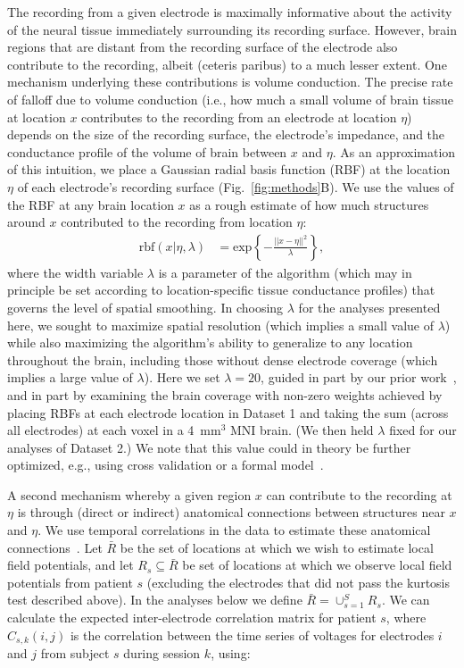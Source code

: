 \documentclass[11pt]{article}
\begin{document}
The recording from a given electrode is maximally informative about
the activity of the neural tissue immediately surrounding its
recording surface.  However, brain regions that are distant from the
recording surface of the electrode also contribute to the recording,
albeit (ceteris paribus) to a much lesser extent.  One mechanism
underlying these contributions is volume conduction.  The precise rate
of falloff due to volume conduction (i.e., how much a small volume of
brain tissue at location $x$ contributes to the recording from an
electrode at location $\eta$) depends on the size of the recording
surface, the electrode's impedance, and the conductance profile of the
volume of brain between $x$ and $\eta$.  As an approximation of this
intuition, we place a Gaussian radial basis function (RBF) at the
location $\eta$ of each electrode's recording surface
(Fig.~\ref{fig:methods}B).  We use the values of the RBF at any brain
location $x$ as a rough estimate of how much structures around $x$
contributed to the recording from location $\eta$:
\begin{align}
  \mathrm{rbf}(x|\eta,\lambda) & =
  \mathrm{exp}\left\{ -\frac{||x - \eta||^2}{\lambda} \right\},\label{eqn:rbf}
\end{align}
where the width variable $\lambda$ is a parameter of the algorithm
(which may in principle be set according to location-specific tissue
conductance profiles) that governs the level of spatial smoothing.  In
choosing $\lambda$ for the analyses presented here, we sought to
maximize spatial resolution (which implies a small value of $\lambda$)
while also maximizing the algorithm's ability to generalize to any
location throughout the brain, including those without dense electrode
coverage (which implies a large value of $\lambda$).  Here we set
$\lambda = 20$, guided in part by our prior work~\citep{MannEtal14b,
  MannEtal18}, and in part by examining the brain coverage with
non-zero weights achieved by placing RBFs at each electrode location
in Dataset 1 and taking the sum (across all electrodes) at each voxel
in a 4~mm$^3$ MNI brain.  (We then held $\lambda$ fixed for our
analyses of Dataset 2.)  We note that this value could in theory be
further optimized, e.g., using cross validation or a formal
model~\citep[e.g.,][]{MannEtal18}.

A second mechanism whereby a given region $x$ can contribute to the
recording at $\eta$ is through (direct or indirect) anatomical
connections between structures near $x$ and $\eta$.  We use temporal
correlations in the data to estimate these anatomical
connections~\citep{BeckEtal18}.  Let $\bar{R}$ be the set of locations
at which we wish to estimate local field potentials, and let
$R_{s} \subseteq \bar{R}$ be set of locations at which we observe local
field potentials from patient $s$ (excluding the electrodes that did
not pass the kurtosis test described above). In the analyses below we
define $\bar{R} = \cup_{s=1}^S R_s$.  We can calculate the expected
inter-electrode correlation matrix for patient $s$, where
$C_{s,k}(i,j)$ is the correlation between the time series of voltages
for electrodes $i$ and $j$ from subject $s$ during session $k$, using:
\end{document}
